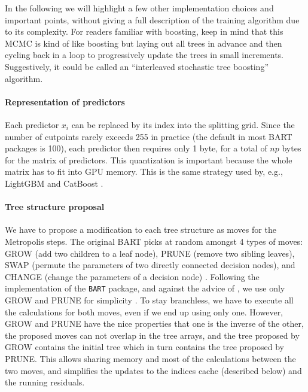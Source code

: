 \documentclass{article}
\begin{document}
In the following we will highlight a few other implementation choices and
important points, without giving a full description of the training algorithm
due to its complexity. For readers familiar with boosting, keep in mind that
this MCMC is kind of like boosting but laying out all trees in advance and then cycling back
in a loop to progressively update the trees in small increments. Suggestively,
it could be called an ``interleaved stochastic tree boosting'' algorithm.

\paragraph{Representation of predictors}

Each predictor $x_i$ can be replaced by its index into the splitting grid. Since
the number of cutpoints rarely exceeds 255 in practice (the default in most BART
packages is 100), each predictor then requires only 1 byte, for a total of $np$
bytes for the matrix of predictors. This quantization is important because the
whole matrix has to fit into GPU memory. This is the same strategy used by,
e.g., LightGBM and CatBoost \autocites{ke_lightgbm_2017}[\S5]{dorogush_catboost_2018}.

\paragraph{Tree structure proposal}

We have to propose a modification to each tree structure as moves for the
Metropolis steps. The original BART picks at random amongst 4 types of moves:
GROW (add two children to a leaf node), PRUNE (remove two sibling leaves), SWAP
(permute the parameters of two directly connected decision nodes), and CHANGE
(change the parameters of a decision node) \citep[\S5.1, p.~940]{chipman1998}.
Following the implementation of the \texttt{BART} package, and against the advice of \textcite[106]{daniels2023}, we use only GROW and
PRUNE for simplicity \citep[\S C, p.~57]{sparapani2021}. To stay branchless, we
have to execute all the calculations for both moves, even if we end up using
only one. However, GROW and PRUNE have the nice properties that one is the inverse of the other, the proposed moves can not
overlap in the tree arrays, and the tree proposed by GROW contains the
initial tree which in turn contains the tree proposed by PRUNE. This allows
sharing memory and most of the calculations between the two moves, and
simplifies the updates to the indices cache (described below) and the running
residuals.
\end{document}
